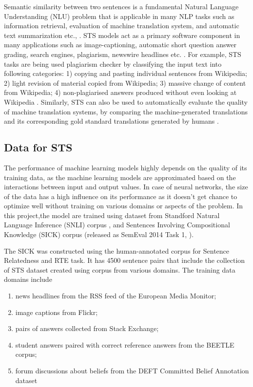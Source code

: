 \documentclass[12pt]{report} %
\begin{document}
Semantic similarity between two sentences is a fundamental Natural Language Understanding (NLU) problem that is applicable in many NLP tasks such as information retrieval, evaluation of machine translation system, and automatic text summarization etc., \citep{agirre2016semeval}. STS models act as a primary software component in many applications such as image-captioning, automatic short question answer grading, search engines, plagiarism, newswire headlines etc. \citep{agirre2016semeval}. For example, STS tasks are being used plagiarism checker by classifying the input text into following categories: 1) copying and pasting individual sentences
from Wikipedia; 2) light revision of material copied from Wikipedia; 3) massive change of content from Wikipedia; 4) non-plagiarised answers produced without even looking at Wikipedia \citep{agirre2015semeval}. Similarly, STS can also be used to automatically evaluate the quality of machine translation systems, by comparing the machine-generated translations and its corresponding gold standard translations generated by humans \cite{agirre2015semeval}. 

\subsection{Data for STS}

The performance of machine learning models highly depends on the quality of its training data, as the machine learning models are approximated based on the interactions between input and output values. In case of neural networks, the size of the data has a high influence on its performance as it doesn't get chance to optimize well without training on various domains or aspects of the problem. In this project,the model are trained using dataset from Standford Natural Language Inference (SNLI) corpus  \citep{bowman2015large}, and Sentences Involving Compositional
Knowledge (SICK) corpus (released as SemEval 2014 Task 1, \citep{marelli2014semeval}).

The SICK \cite{marelli2014semeval}  was constructed using the human-annotated corpus for Sentence Relatedness and RTE task. It has 4500 sentence pairs that include the collection of STS dataset created using corpus from various domains. The training data domains include 
\begin{enumerate}
	\item news headlines from the RSS feed of the European Media Monitor;
	\item image captions from Flickr;
	\item pairs of answers collected from Stack Exchange;
	\item student answers paired with correct reference answers from the BEETLE corpus;
	\item forum discussions about beliefs from the DEFT Committed Belief Annotation dataset
\end{enumerate}
\end{document}
